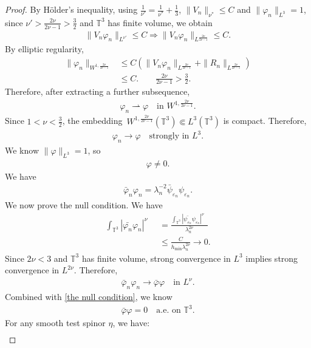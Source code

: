 \documentclass[11pt,final]{amsart}
\newcommand{\T}{\mathbb{T}}
\newcommand{\dd}{\mathop{}\!\mathrm{d}}
\newcommand{\eps}{\varepsilon}
\DeclareMathOperator{\dv}{\dd{vol}}
\begin{document}
\begin{proof}
By H\"{o}lder's inequality, using $\frac1{\nu'}=\frac1{\nu^*}+\frac13$, $\|V_n\|_{\nu^*}\le C$ and $\|\varphi_n\|_{L^3}=1$, since $ \nu'>\frac{2\nu}{2\nu-1}>\frac{3}{2}$ and $\T^3$ has finite volume, we obtain \begin{align}
\|V_n\varphi_n\|_{L^{ \nu'}}\leq C \Rightarrow\|V_n\varphi_n\|_{L^{\frac{2\nu}{2\nu-1}}}\leq C.
\end{align}
By elliptic regularity,
\begin{align}
\|\varphi_n\|_{W^{1,\frac{2\nu}{2\nu-1}}}
&\le
C\left(
\|V_n\varphi_n\|_{L^{\frac{2\nu}{2\nu-1}}}
+\|R_n\|_{L^{\frac{2\nu}{2\nu-1}}}
\right)\\
&\le C.\qquad \frac{2\nu}{2\nu-1}>\frac{3}{2}.
\end{align}
Therefore, after extracting a further subsequence,
\begin{align}
\varphi_n\rightharpoonup\varphi
\quad\text{in }W^{1,\frac{2\nu}{2\nu-1}}.
\end{align}
Since $1<\nu<\frac{3}{2}$, the embedding~$W^{1,\frac{2\nu}{2\nu-1}}(\T^3)\Subset L^{3}(\T^3)$ is compact. Therefore,
\begin{align}
\varphi_n\to\varphi
\quad\text{strongly in }L^3.
\end{align}
We know $\|\varphi\|_{L^3}=1$, so
\begin{align}
\varphi\ne0.
\end{align}
We have 
\begin{align}
\bar\varphi_n\varphi_n=
\lambda_n^{-2}
\bar\psi_{\eps_n}\psi_{\eps_n}.
\end{align}
We now prove the null condition. We have
\begin{align}\label{the null condition}
\int_{\T^3}|\bar{\varphi_n}\varphi_n|^{\nu}\dv&=\frac{\int_{\T^3}|\bar{\psi_{\eps_n}}\psi_{\eps_n}|^{\nu}\dv}{\lambda_n^{2\nu}}\\
&\leq \frac{C}{h_{\min}\lambda_n^{2\nu}}\to0.
\end{align}
Since $2\nu<3$ and $\T^3$ has finite volume, strong convergence in $L^3$ implies strong convergence in $L^{2\nu}$. Therefore,
\begin{align}
\bar\varphi_n\varphi_n\to\bar\varphi\varphi
\quad\text{in }L^\nu.
\end{align}
Combined with \eqref{the null condition}, we know
\begin{align}
\bar\varphi\varphi=0
\quad\text{a.e. on }\T^3.
\end{align}
For any smooth test spinor $\eta$, we have:
\begin{align}

\end{align}
\end{proof}
\end{document}
